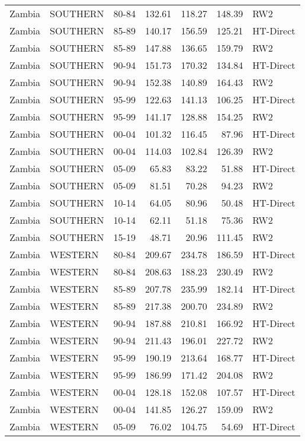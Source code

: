 \begin{longtable}{lllrrrl}
  Zambia & SOUTHERN & 80-84 & 132.61 & 118.27 & 148.39 & RW2 \\ 
  Zambia & SOUTHERN & 85-89 & 140.17 & 156.59 & 125.21 & HT-Direct \\ 
  Zambia & SOUTHERN & 85-89 & 147.88 & 136.65 & 159.79 & RW2 \\ 
  Zambia & SOUTHERN & 90-94 & 151.73 & 170.32 & 134.84 & HT-Direct \\ 
  Zambia & SOUTHERN & 90-94 & 152.38 & 140.89 & 164.43 & RW2 \\ 
  Zambia & SOUTHERN & 95-99 & 122.63 & 141.13 & 106.25 & HT-Direct \\ 
  Zambia & SOUTHERN & 95-99 & 141.17 & 128.88 & 154.25 & RW2 \\ 
  Zambia & SOUTHERN & 00-04 & 101.32 & 116.45 & 87.96 & HT-Direct \\ 
  Zambia & SOUTHERN & 00-04 & 114.03 & 102.84 & 126.39 & RW2 \\ 
  Zambia & SOUTHERN & 05-09 & 65.83 & 83.22 & 51.88 & HT-Direct \\ 
  Zambia & SOUTHERN & 05-09 & 81.51 & 70.28 & 94.23 & RW2 \\ 
  Zambia & SOUTHERN & 10-14 & 64.05 & 80.96 & 50.48 & HT-Direct \\ 
  Zambia & SOUTHERN & 10-14 & 62.11 & 51.18 & 75.36 & RW2 \\ 
  Zambia & SOUTHERN & 15-19 & 48.71 & 20.96 & 111.45 & RW2 \\ 
  Zambia & WESTERN & 80-84 & 209.67 & 234.78 & 186.59 & HT-Direct \\ 
  Zambia & WESTERN & 80-84 & 208.63 & 188.23 & 230.49 & RW2 \\ 
  Zambia & WESTERN & 85-89 & 207.78 & 235.99 & 182.14 & HT-Direct \\ 
  Zambia & WESTERN & 85-89 & 217.38 & 200.70 & 234.89 & RW2 \\ 
  Zambia & WESTERN & 90-94 & 187.88 & 210.81 & 166.92 & HT-Direct \\ 
  Zambia & WESTERN & 90-94 & 211.43 & 196.01 & 227.72 & RW2 \\ 
  Zambia & WESTERN & 95-99 & 190.19 & 213.64 & 168.77 & HT-Direct \\ 
  Zambia & WESTERN & 95-99 & 186.99 & 171.42 & 204.08 & RW2 \\ 
  Zambia & WESTERN & 00-04 & 128.18 & 152.08 & 107.57 & HT-Direct \\ 
  Zambia & WESTERN & 00-04 & 141.85 & 126.27 & 159.09 & RW2 \\ 
  Zambia & WESTERN & 05-09 & 76.02 & 104.75 & 54.69 & HT-Direct \\ 

\end{longtable}
